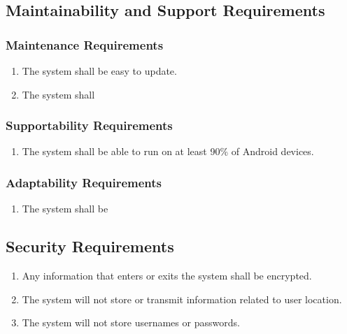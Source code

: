 \documentclass[titlepage]{article}
\begin{document}
		
		\subsection{Maintainability and Support Requirements}
		\label{sub:maintainability_and_support_requirements}
		\subsubsection{Maintenance Requirements}
		\label{ssub:maintenance_requirements}
		\begin{enumerate}
			\item 
			The system shall be easy to update.
			\item
			The system shall 
		\end{enumerate}
		
		\subsubsection{Supportability Requirements}
		\label{ssub:supportability_requirements}
		\begin{enumerate}
			\item 
			The system shall be able to run on at least 90\% of Android devices.
		\end{enumerate}
		
		\subsubsection{Adaptability Requirements}
		\label{ssub:adaptability_requirements}
		\begin{enumerate}
			\item
			The system shall be 
		\end{enumerate}
		
		
		\subsection{Security Requirements}
		\label{sub:security_requirements}
		\begin{enumerate}
			\item
			Any information that enters or exits the system shall be encrypted.
			\item
			The system will not store or transmit information related to user location.
			\item
			The system will not store usernames or passwords.
		\end{enumerate}
		
\end{document}
